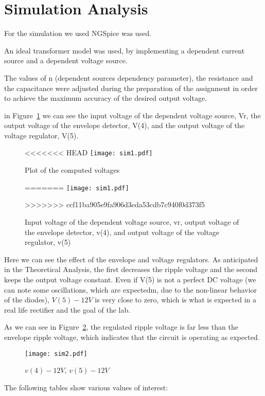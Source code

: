 \section{Simulation Analysis}
\label{sec:simulation}

For the simulation we used NGSpice was used.

An ideal transformer model was used, by implementing a dependent current source and a dependent voltage source. 

The values of n (dependent sources dependency parameter), the resistance and the capacitance were adjusted during the preparation of the assignment in order to achieve
the maximum accuracy of the desired output voltage.

in Figure~\ref{fig:sim3a} we can see the input voltage of the dependent voltage source, Vr, the output voltage of the envelope detector, V(4), and the output voltage of the voltage regulator, V(5).


\begin{figure}[h] \centering
<<<<<<< HEAD
\texttt{[image: sim1.pdf]}
	\caption{Plot of the computed voltages}
=======
\texttt{[image: sim1.pdf]}
	\caption{Input voltage of the dependent voltage source, vr, output voltage of the envelope detector, v(4), and output voltage of the voltage regulator, v(5)}
>>>>>>> ccf11ba905e9fa906d3eda53cdb7c940f0d373f5
\label{fig:sim3a}
\end{figure}


Here we can see the effect of the envelope and voltage regulators. As anticipated in the Theoretical Analysis, the first decreases the ripple voltage and 
the second keeps the output voltage constant. Even if V(5) is not a perfect DC voltage (we can note some oscillations, which are expectedm, due to the non-linear behavior of the diodes), $V(5) - 12V$ is 
very close to zero, which is what is expected in a real life rectifier and the goal of the lab. 

As we can see in Figure~\ref{fig:sim3b}, the regulated ripple voltage is far less than the envelope ripple voltage, which indicates that the circuit is operating as expected. 

\begin{figure}[h] \centering
\texttt{[image: sim2.pdf]}
	\caption{$v(4)-12V$, $v(5)-12V$}                        
\label{fig:sim3b} 
\end{figure}

The following tables show various values of interest:

